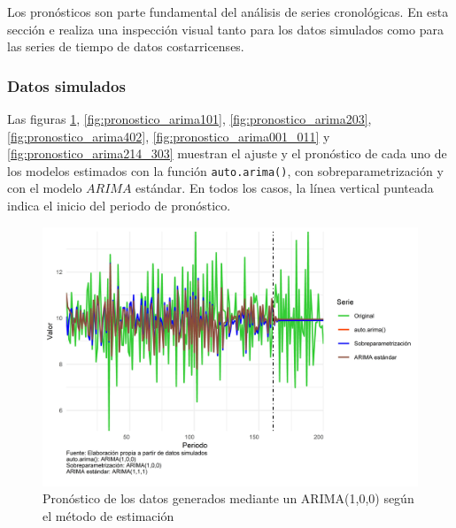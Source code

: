 \documentclass[
]{article}
\begin{document}
Los pronósticos son parte fundamental del análisis de series
cronológicas. En esta sección e realiza una inspección visual tanto para
los datos simulados como para las series de tiempo de datos
costarricenses.

\subsubsection{Datos simulados}

Las figuras \ref{fig:pronostico_arima100},
\ref{fig:pronostico_arima101}, \ref{fig:pronostico_arima203},
\ref{fig:pronostico_arima402}, \ref{fig:pronostico_arima001_011} y
\ref{fig:pronostico_arima214_303} muestran el ajuste y el pronóstico de
cada uno de los modelos estimados con la función \texttt{auto.arima()},
con sobreparametrización y con el modelo \(ARIMA\) estándar. En todos
los casos, la línea vertical punteada indica el inicio del periodo de
pronóstico.

\begin{figure}[H]
\includegraphics[width=1\linewidth,height=1\textheight]{Tesis_files/figure-latex/pronostico_arima100-1} \caption{Pronóstico de los datos generados mediante un ARIMA(1,0,0) según el método de estimación}\label{fig:pronostico_arima100}
\end{figure}
\end{document}
